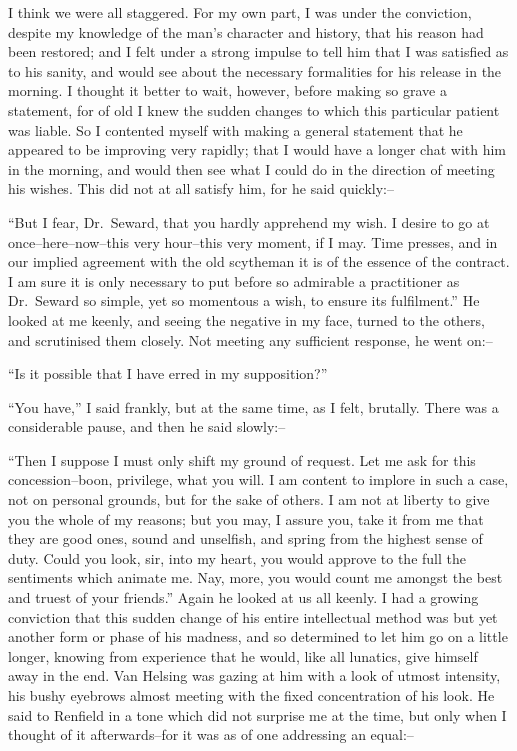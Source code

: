 \documentclass[12pt,openright]{book}
\begin{document}
I think we were all staggered. For my own part, I was under the conviction, despite my knowledge of the man’s character and history, that his reason had been restored; and I felt under a strong impulse to tell him that I was satisfied as to his sanity, and would see about the necessary formalities for his release in the morning. I thought it better to wait, however, before making so grave a statement, for of old I knew the sudden changes to which this particular patient was liable. So I contented myself with making a general statement that he appeared to be improving very rapidly; that I would have a longer chat with him in the morning, and would then see what I could do in the direction of meeting his wishes. This did not at all satisfy him, for he said quickly:–

“But I fear, Dr. Seward, that you hardly apprehend my wish. I desire to go at once–here–now–this very hour–this very moment, if I may. Time presses, and in our implied agreement with the old scytheman it is of the essence of the contract. I am sure it is only necessary to put before so admirable a practitioner as Dr. Seward so simple, yet so momentous a wish, to ensure its fulfilment.” He looked at me keenly, and seeing the negative in my face, turned to the others, and scrutinised them closely. Not meeting any sufficient response, he went on:–

“Is it possible that I have erred in my supposition?”

“You have,” I said frankly, but at the same time, as I felt, brutally. There was a considerable pause, and then he said slowly:–

“Then I suppose I must only shift my ground of request. Let me ask for this concession–boon, privilege, what you will. I am content to implore in such a case, not on personal grounds, but for the sake of others. I am not at liberty to give you the whole of my reasons; but you may, I assure you, take it from me that they are good ones, sound and unselfish, and spring from the highest sense of duty. Could you look, sir, into my heart, you would approve to the full the sentiments which animate me. Nay, more, you would count me amongst the best and truest of your friends.” Again he looked at us all keenly. I had a growing conviction that this sudden change of his entire intellectual method was but yet another form or phase of his madness, and so determined to let him go on a little longer, knowing from experience that he would, like all lunatics, give himself away in the end. Van Helsing was gazing at him with a look of utmost intensity, his bushy eyebrows almost meeting with the fixed concentration of his look. He said to Renfield in a tone which did not surprise me at the time, but only when I thought of it afterwards–for it was as of one addressing an equal:–
\end{document}
